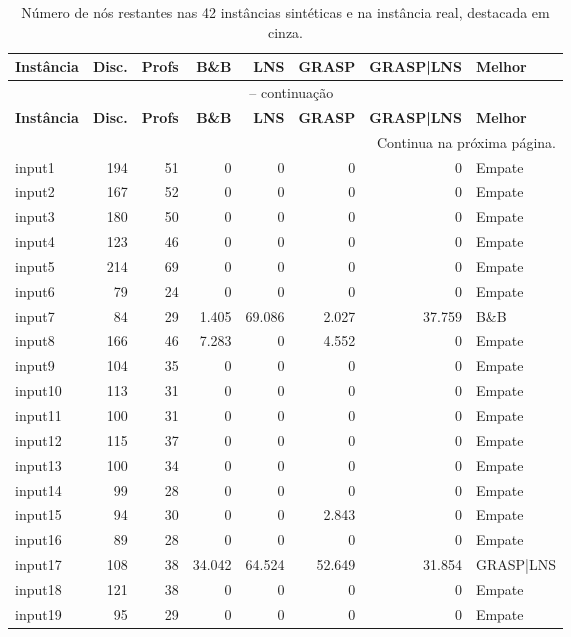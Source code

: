 \begingroup
\setlength{\tabcolsep}{3pt}
\scriptsize
\begin{longtable}{@{}lrrrrrrl@{}}
\caption{Número de nós restantes nas 42 instâncias sintéticas e na instância real, destacada em cinza.}\label{tab:geral_nodes}\\
\toprule
\textbf{Instância} & \textbf{Disc.} & \textbf{Profs} & \textbf{B\&B} & \textbf{LNS} & \textbf{GRASP} & \textbf{GRASP|LNS} & \textbf{Melhor} \\
\midrule
\endfirsthead
\multicolumn{8}{c}{\tablename\ \thetable{} -- continuação}\\
\toprule
\textbf{Instância} & \textbf{Disc.} & \textbf{Profs} & \textbf{B\&B} & \textbf{LNS} & \textbf{GRASP} & \textbf{GRASP|LNS} & \textbf{Melhor} \\
\midrule
\endhead
\midrule
\multicolumn{8}{r}{Continua na próxima página.}\\
\endfoot
\bottomrule
\endlastfoot
input1 & 194 & 51 & 0 & 0 & 0 & 0 & Empate \\
input2 & 167 & 52 & 0 & 0 & 0 & 0 & Empate \\
input3 & 180 & 50 & 0 & 0 & 0 & 0 & Empate \\
input4 & 123 & 46 & 0 & 0 & 0 & 0 & Empate \\
input5 & 214 & 69 & 0 & 0 & 0 & 0 & Empate \\
input6 & 79 & 24 & 0 & 0 & 0 & 0 & Empate \\
input7 & 84 & 29 & 1.405 & 69.086 & 2.027 & 37.759 & B\&B \\
input8 & 166 & 46 & 7.283 & 0 & 4.552 & 0 & Empate \\
input9 & 104 & 35 & 0 & 0 & 0 & 0 & Empate \\
input10 & 113 & 31 & 0 & 0 & 0 & 0 & Empate \\
input11 & 100 & 31 & 0 & 0 & 0 & 0 & Empate \\
input12 & 115 & 37 & 0 & 0 & 0 & 0 & Empate \\
input13 & 100 & 34 & 0 & 0 & 0 & 0 & Empate \\
input14 & 99 & 28 & 0 & 0 & 0 & 0 & Empate \\
input15 & 94 & 30 & 0 & 0 & 2.843 & 0 & Empate \\
input16 & 89 & 28 & 0 & 0 & 0 & 0 & Empate \\
input17 & 108 & 38 & 34.042 & 64.524 & 52.649 & 31.854 & GRASP{|}LNS \\
input18 & 121 & 38 & 0 & 0 & 0 & 0 & Empate \\
input19 & 95 & 29 & 0 & 0 & 0 & 0 & Empate \\

\end{longtable}
